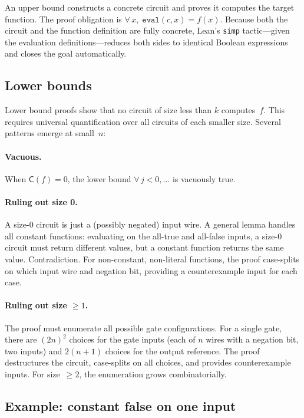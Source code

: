 \documentclass[11pt]{article}
\newcommand{\CC}{\mathsf{C}}
\begin{document}
An upper bound constructs a concrete circuit and proves it computes the target
function. The proof obligation is
$\forall\, x,\; \texttt{eval}(c, x) = f(x)$.
Because both the circuit and the function definition are fully concrete, Lean's
\texttt{simp} tactic---given the evaluation definitions---reduces both sides to
identical Boolean expressions and closes the goal automatically.

\subsection{Lower bounds}

Lower bound proofs show that no circuit of size less than $k$ computes~$f$.
This requires universal quantification over all circuits of each smaller size.
Several patterns emerge at small~$n$:

\paragraph{Vacuous.} When $\CC(f) = 0$, the lower bound
$\forall\, j < 0, \ldots$ is vacuously true.

\paragraph{Ruling out size 0.} A size-0 circuit is just a (possibly negated)
input wire. A general lemma handles all constant functions: evaluating on the
all-true and all-false inputs, a size-0 circuit must return different values,
but a constant function returns the same value. Contradiction. For non-constant,
non-literal functions, the proof case-splits on which input wire and negation
bit, providing a counterexample input for each case.

\paragraph{Ruling out size $\ge 1$.} The proof must enumerate all possible
gate configurations. For a single gate, there are $(2n)^2$ choices for the gate
inputs (each of $n$ wires with a negation bit, two inputs) and $2(n+1)$
choices for the output reference. The proof destructures the circuit,
case-splits on all choices, and provides counterexample inputs. For size~$\ge 2$,
the enumeration grows combinatorially.

\subsection{Example: constant false on one input}
\end{document}
